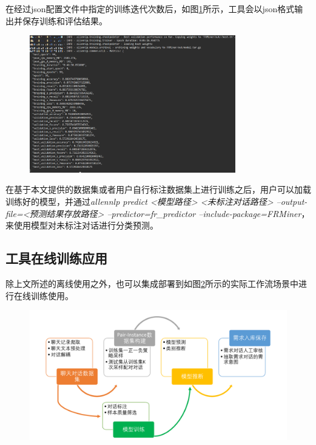 在经过json配置文件中指定的训练迭代次数后，如图\ref{fig:model-result}所示，{\tool}工具会以json格式输出并保存训练和评估结果。
\begin{figure}[htb]
    \centering
    \includegraphics[width=0.8\textwidth]{Img/result.png}
    \label{fig:model-result}
\end{figure}

在基于本文提供的数据集或者用户自行标注数据集上进行训练之后，用户可以加载训练好的模型，并通过\textit{allennlp predict <模型路径> <未标注对话路径> --output-file=<预测结果存放路径> --predictor=fr\_predictor --include-package=FRMiner}，来使用模型对未标注对话进行分类预测。

\subsection{{\tool}工具在线训练应用}
除上文所述的离线使用之外，{\tool}也可以集成部署到如图\ref{fig:workflow}所示的实际工作流场景中进行在线训练使用。
\begin{figure}[htb]
    \centering
    \includegraphics[width=\textwidth]{Img/FRMiner-workflow.pdf}
    \label{fig:workflow}
\end{figure}

